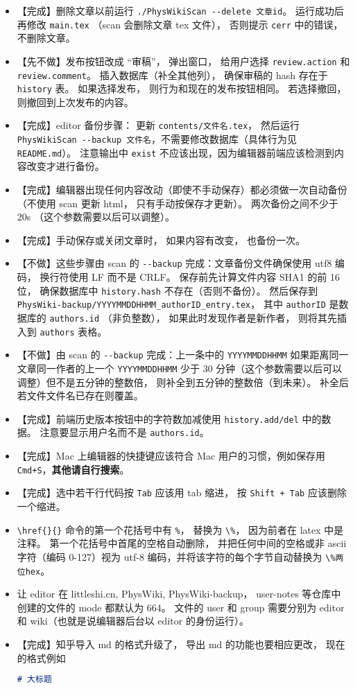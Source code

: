 \begin{itemize}
\item 【完成】删除文章以前运行 \verb`./PhysWikiScan --delete 文章id`。 运行成功后再修改 \verb`main.tex` （scan 会删除文章 tex 文件）， 否则提示 \verb`cerr` 中的错误， 不删除文章。
\item 【先不做】发布按钮改成 “审稿”， 弹出窗口， 给用户选择 \verb`review.action` 和 \verb`review.comment`。 插入数据库（补全其他列）， 确保审稿的 hash 存在于 \verb`history` 表。 如果选择发布， 则行为和现在的发布按钮相同。 若选择撤回， 则撤回到上次发布的内容。
\item 【完成】editor 备份步骤： 更新 \verb`contents/文件名.tex`， 然后运行 \verb`PhysWikiScan --backup 文件名`，不需要修改数据库（具体行为见 \verb`README.md`）。 注意输出中 \verb`exist` 不应该出现，因为编辑器前端应该检测到内容改变才进行备份。
\item 【完成】编辑器出现任何内容改动（即使不手动保存）都必须做一次自动备份（不使用 scan 更新 html， 只有手动按保存才更新）。 两次备份之间不少于 20s （这个参数需要以后可以调整）。
\item 【完成】手动保存或关闭文章时， 如果内容有改变， 也备份一次。
\item 【不做】这些步骤由 scan 的 \verb`--backup` 完成：文章备份文件确保使用 utf8 编码， 换行符使用 LF 而不是 CRLF。 保存前先计算文件内容 SHA1 的前 16 位， 确保数据库中 \verb`history.hash` 不存在（否则不备份）。 然后保存到 \verb`PhysWiki-backup/YYYYMMDDHHMM_authorID_entry.tex`， 其中 \verb`authorID` 是数据库的 \verb`authors.id` （非负整数）， 如果此时发现作者是新作者， 则将其先插入到 \verb`authors` 表格。
\item 【不做】由 scan 的 \verb`--backup` 完成：上一条中的 \verb`YYYYMMDDHHMM` 如果距离同一文章同一作者的上一个 \verb`YYYYMMDDHHMM` 少于 30 分钟（这个参数需要以后可以调整）但不是五分钟的整数倍， 则补全到五分钟的整数倍（到未来）。 补全后若文件文件名已存在则覆盖。
\item 【完成】前端历史版本按钮中的字符数加减使用 \verb`history.add/del` 中的数据。 注意要显示用户名而不是 \verb`authors.id`。
\item 【完成】Mac 上编辑器的快捷键应该符合 Mac 用户的习惯，例如保存用 \verb`Cmd+S`，\textbf{其他请自行搜索}。
\item 【完成】选中若干行代码按 \verb`Tab` 应该用 tab 缩进， 按 \verb`Shift + Tab` 应该删除一个缩进。
\item \verb`\href{}{}` 命令的第一个花括号中有 \verb`%`， 替换为 \verb`\%`， 因为前者在 latex 中是注释。 第一个花括号中首尾的空格自动删除， 并把任何中间的空格或非 ascii 字符（编码 0-127）视为 utf-8 编码，并将该字符的每个字节自动替换为 \verb`\%两位hex`。
\item 让 editor 在 littleshi.cn, PhysWiki, PhysWiki-backup， user-notes 等仓库中创建的文件的 mode 都默认为 664。 文件的 user 和 group 需要分别为 editor 和 wiki（也就是说编辑器后台以 editor 的身份运行）。
\item 【完成】知乎导入 md 的格式升级了， 导出 md 的功能也要相应更改， 现在的格式例如
\begin{lstlisting}[language=markdown]
# 大标题


\end{lstlisting}
\end{itemize}
